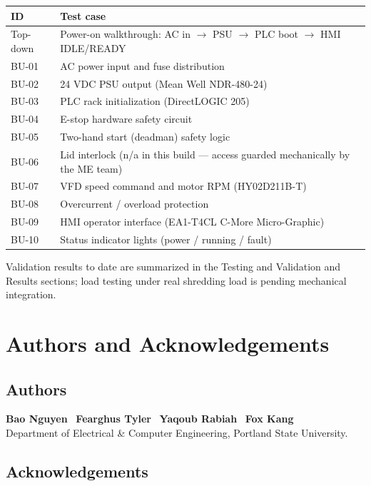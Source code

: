 \documentclass[hidelinks,12pt]{article}
\begin{document}
\renewcommand{\arraystretch}{1.2}
\noindent\begin{tabularx}{\textwidth}{|l|X|}
\hline
\textbf{ID} & \textbf{Test case} \\
\hline
Top-down & Power-on walkthrough: AC in $\rightarrow$ PSU $\rightarrow$ PLC boot $\rightarrow$ HMI IDLE/READY \\ \hline
BU-01 & AC power input and fuse distribution \\ \hline
BU-02 & 24 VDC PSU output (Mean Well NDR-480-24) \\ \hline
BU-03 & PLC rack initialization (DirectLOGIC 205) \\ \hline
BU-04 & E-stop hardware safety circuit \\ \hline
BU-05 & Two-hand start (deadman) safety logic \\ \hline
BU-06 & Lid interlock (n/a in this build --- access guarded mechanically by the ME team) \\ \hline
BU-07 & VFD speed command and motor RPM (HY02D211B-T) \\ \hline
BU-08 & Overcurrent / overload protection \\ \hline
BU-09 & HMI operator interface (EA1-T4CL C-More Micro-Graphic) \\ \hline
BU-10 & Status indicator lights (power / running / fault) \\
\hline
\end{tabularx}
\renewcommand{\arraystretch}{1.0}

Validation results to date are summarized in the Testing and Validation and Results
sections; load testing under real shredding load is pending mechanical integration.

\newpage
\section{Authors and Acknowledgements}

\subsection*{\textcolor{PSUgreen}{Authors}}
\noindent \textcolor{PSUblue}{\textbf{Bao Nguyen}} \textbullet\ \textcolor{PSUblue}{\textbf{Fearghus Tyler}} \textbullet\ \textcolor{PSUblue}{\textbf{Yaqoub Rabiah}} \textbullet\ \textcolor{PSUblue}{\textbf{Fox Kang}}\\
{\small Department of Electrical \& Computer Engineering, Portland State University.}

\subsection*{\textcolor{PSUgreen}{Acknowledgements}}
\end{document}
